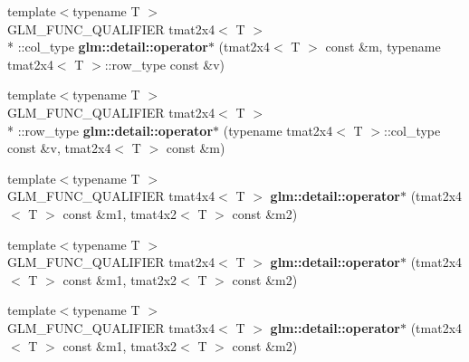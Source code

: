 \begin{DoxyCompactItemize}
\item 
\hypertarget{namespaceglm_1_1detail_ab9e94def233a4d8905775fcdb8132008}{{\footnotesize template$<$typename T $>$ }\\G\-L\-M\-\_\-\-F\-U\-N\-C\-\_\-\-Q\-U\-A\-L\-I\-F\-I\-E\-R tmat2x4$<$ T $>$\\*
\-::col\-\_\-type {\bfseries glm\-::detail\-::operator$\ast$} (tmat2x4$<$ T $>$ const \&m, typename tmat2x4$<$ T $>$\-::row\-\_\-type const \&v)}\label{namespaceglm_1_1detail_ab9e94def233a4d8905775fcdb8132008}

\item 
\hypertarget{namespaceglm_1_1detail_a741bf58af36b55b9320191e61efdb804}{{\footnotesize template$<$typename T $>$ }\\G\-L\-M\-\_\-\-F\-U\-N\-C\-\_\-\-Q\-U\-A\-L\-I\-F\-I\-E\-R tmat2x4$<$ T $>$\\*
\-::row\-\_\-type {\bfseries glm\-::detail\-::operator$\ast$} (typename tmat2x4$<$ T $>$\-::col\-\_\-type const \&v, tmat2x4$<$ T $>$ const \&m)}\label{namespaceglm_1_1detail_a741bf58af36b55b9320191e61efdb804}

\item 
\hypertarget{namespaceglm_1_1detail_afe1d0397afae94fe4913a1ba2b583f43}{{\footnotesize template$<$typename T $>$ }\\G\-L\-M\-\_\-\-F\-U\-N\-C\-\_\-\-Q\-U\-A\-L\-I\-F\-I\-E\-R tmat4x4$<$ T $>$ {\bfseries glm\-::detail\-::operator$\ast$} (tmat2x4$<$ T $>$ const \&m1, tmat4x2$<$ T $>$ const \&m2)}\label{namespaceglm_1_1detail_afe1d0397afae94fe4913a1ba2b583f43}

\item 
\hypertarget{namespaceglm_1_1detail_a5a2715c0f6e95bd02de87a034b56d5e3}{{\footnotesize template$<$typename T $>$ }\\G\-L\-M\-\_\-\-F\-U\-N\-C\-\_\-\-Q\-U\-A\-L\-I\-F\-I\-E\-R tmat2x4$<$ T $>$ {\bfseries glm\-::detail\-::operator$\ast$} (tmat2x4$<$ T $>$ const \&m1, tmat2x2$<$ T $>$ const \&m2)}\label{namespaceglm_1_1detail_a5a2715c0f6e95bd02de87a034b56d5e3}

\item 
\hypertarget{namespaceglm_1_1detail_a83d520b3203d51074292b3d0191d7bd8}{{\footnotesize template$<$typename T $>$ }\\G\-L\-M\-\_\-\-F\-U\-N\-C\-\_\-\-Q\-U\-A\-L\-I\-F\-I\-E\-R tmat3x4$<$ T $>$ {\bfseries glm\-::detail\-::operator$\ast$} (tmat2x4$<$ T $>$ const \&m1, tmat3x2$<$ T $>$ const \&m2)}\label{namespaceglm_1_1detail_a83d520b3203d51074292b3d0191d7bd8}


\end{DoxyCompactItemize}
